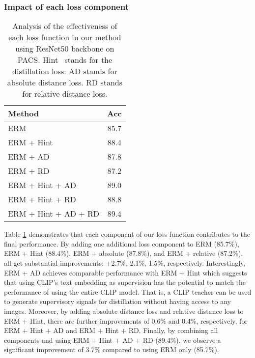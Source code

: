 \documentclass[10pt,twocolumn,letterpaper]{article}
\begin{document}
\subsubsection{Impact of each loss component}

\begin{table}[htbp]
\begin{center}
\footnotesize
\begin{tabular}{l | c }
\hline
Method  & Acc \\
\hline \hline
ERM & 85.7 \\
ERM + Hint &  88.4\\
ERM + AD & 87.8 \\
ERM + RD &  87.2\\
ERM + Hint + AD &  89.0\\
ERM + Hint + RD &  88.8\\
\rowcolor{lightgray!30}ERM + Hint + AD + RD & 89.4\\
\hline
\end{tabular}
\vspace{5pt}
\caption{Analysis of the effectiveness of each loss function in our method using ResNet50 backbone on PACS. Hint~\cite{hinton2015distilling} stands for the distillation loss. AD stands for absolute distance loss. RD stands for relative distance loss.}
\label{table:eachloss}
\end{center}
\end{table}

Table \ref{table:eachloss} demonstrates that each component of our loss function contributes to the final performance. By adding one additional loss component to ERM (85.7\%), ERM + Hint (88.4\%), ERM + absolute (87.8\%), and ERM + relative (87.2\%), all get substantial improvements: +2.7\%, 2.1\%, 1.5\%, respectively. Interestingly, ERM + AD achieves comparable performance with ERM + Hint which suggests that using CLIP's text embedding as supervision has the potential to match the performance of using the entire CLIP model. That is, a CLIP teacher can be used to generate supervisory signals for distillation without having access to any images. 
Moreover, by adding absolute distance loss and relative distance loss to ERM + Hint, there are further improvements of 0.6\% and 0.4\%, respectively, for ERM + Hint + AD and ERM + Hint + RD. Finally, by combining all components and using ERM + Hint + AD + RD (89.4\%), we observe a significant improvement of 3.7\% compared to using ERM only (85.7\%).
\end{document}
